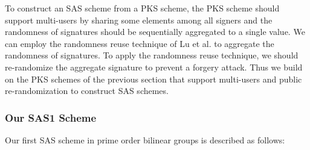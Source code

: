 \documentclass[11pt,letterpaper]{article}
\begin{document}
To construct an SAS scheme from a PKS scheme, the PKS scheme should support
multi-users by sharing some elements among all signers and the randomness of
signatures should be sequentially aggregated to a single value. We can employ
the randomness reuse technique of Lu et al. \cite{LuOSSW06} to aggregate the
randomness of signatures. To apply the randomness reuse technique, we should
re-randomize the aggregate signature to prevent a forgery attack. Thus we
build on the PKS schemes of the previous section that support multi-users and
public re-randomization to construct SAS schemes.

\subsubsection{Our SAS1 Scheme}

Our first SAS scheme in prime order bilinear groups is described as follows:
\end{document}

